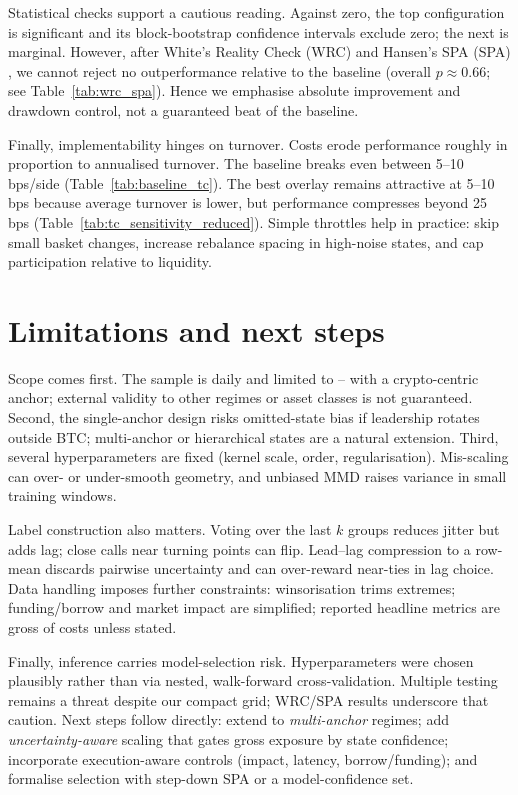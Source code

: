 Statistical checks support a cautious reading. Against zero, the top configuration is significant and its block-bootstrap confidence intervals exclude zero; the next is marginal. However, after White’s Reality Check (WRC) \cite{White2000} and Hansen’s SPA (SPA) \cite{Hansen2005}, we cannot reject no outperformance relative to the baseline (overall \(p\approx0.66\); see Table~\ref{tab:wrc_spa}). Hence we emphasise absolute improvement and drawdown control, not a guaranteed beat of the baseline.

Finally, implementability hinges on turnover. Costs erode performance roughly in proportion to annualised turnover. The baseline breaks even between 5–10 bps/side (Table~\ref{tab:baseline_tc}). The best overlay remains attractive at 5–10 bps because average turnover is lower, but performance compresses beyond 25 bps (Table~\ref{tab:tc_sensitivity_reduced}). Simple throttles help in practice: skip small basket changes, increase rebalance spacing in high-noise states, and cap participation relative to liquidity.

\section{Limitations and next steps}\label{sec:disc:limits}

Scope comes first. The sample is daily and limited to \sampleStart{}–\sampleEnd{} with a crypto-centric anchor; external validity to other regimes or asset classes is not guaranteed. Second, the single-anchor design risks omitted-state bias if leadership rotates outside BTC; multi-anchor or hierarchical states are a natural extension. Third, several hyperparameters are fixed (kernel scale, order, regularisation). Mis-scaling can over- or under-smooth geometry, and unbiased MMD raises variance in small training windows.

Label construction also matters. Voting over the last \(k\) groups reduces jitter but adds lag; close calls near turning points can flip. Lead--lag compression to a row-mean discards pairwise uncertainty and can over-reward near-ties in lag choice. Data handling imposes further constraints: winsorisation trims extremes; funding/borrow and market impact are simplified; reported headline metrics are gross of costs unless stated.

Finally, inference carries model-selection risk. Hyperparameters were chosen plausibly rather than via nested, walk-forward cross-validation. Multiple testing remains a threat despite our compact grid; WRC/SPA results underscore that caution. Next steps follow directly: extend to \emph{multi-anchor} regimes; add \emph{uncertainty-aware} scaling that gates gross exposure by state confidence; incorporate execution-aware controls (impact, latency, borrow/funding); and formalise selection with step-down SPA or a model-confidence set.
